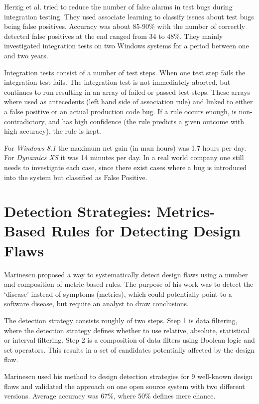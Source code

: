 \documentclass{uvamscse}
\begin{document}
Herzig et al. \cite{herzig2015empirically} tried to reduce the number of false alarms in test bugs during integration testing. They used associate learning to classify issues about test bugs being false positives. Accuracy was about 85-90\% with the number of correctly detected false positives at the end ranged from 34 to 48\%. They mainly investigated integration tests on two Windows systems for a period between one and two years. 

Integration tests consist of a number of test steps. When one test step fails the integration test fails. The integration test is not immediately aborted, but continues to run resulting in an array of failed or passed test steps. These arrays where used as antecedents (left hand side of association rule) and linked to either a false positive or an actual production code bug. If a rule occurs enough, is non-contradictory, and has high confidence (the rule predicts a given outcome with high accuracy), the rule is kept. 

For \textit{Windows 8.1} the maximum net gain (in man hours) was 1.7 hours per day. For \textit{Dynamics XS} it was 14 minutes per day. In a real world company one still needs to investigate each case, since there exist cases where a bug is introduced into the system but classified as False Positive. 

\section{Detection Strategies: Metrics-Based Rules for Detecting Design Flaws}
Marinescu \cite{marinescu2004detection} proposed a way to systematically detect design flaws using a number and composition of metric-based rules. The purpose of his work was to detect the ‘disease’ instead of symptoms (metrics), which could potentially point to a software disease, but require an analyst to draw conclusions. 

The detection strategy consists roughly of two steps. Step 1 is data filtering, where the detection strategy defines whether to use relative, absolute, statistical or interval filtering. Step 2 is a composition of data filters using Boolean logic and set operators. This results in a set of candidates potentially affected by the design flaw. 

Marinescu used his method to design detection strategies for 9 well-known design flaws and validated the approach on one open source system with two different versions.  Average accuracy was 67\%, where 50\% defines mere chance. 
\end{document}
